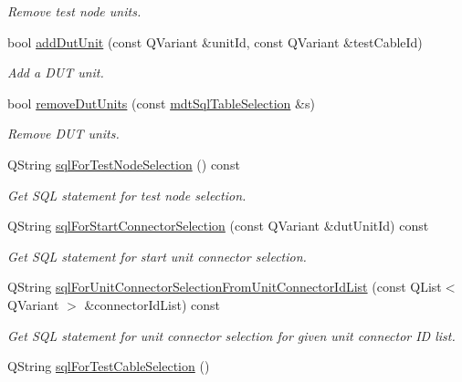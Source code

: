 \begin{DoxyCompactItemize}
\begin{DoxyCompactList}\small\item\em Remove test node units. \end{DoxyCompactList}\item 
bool \hyperlink{classmdt_tt_test_connection_cable_af024a5c28e223181ff318978abcbe1f1}{add\-Dut\-Unit} (const Q\-Variant \&unit\-Id, const Q\-Variant \&test\-Cable\-Id)
\begin{DoxyCompactList}\small\item\em Add a D\-U\-T unit. \end{DoxyCompactList}\item 
bool \hyperlink{classmdt_tt_test_connection_cable_a268dafea5cc285e4992c38ea86ea98a9}{remove\-Dut\-Units} (const \hyperlink{classmdt_sql_table_selection}{mdt\-Sql\-Table\-Selection} \&s)
\begin{DoxyCompactList}\small\item\em Remove D\-U\-T units. \end{DoxyCompactList}\item 
Q\-String \hyperlink{classmdt_tt_test_connection_cable_a03785cef753bae2d7d2dfd0fe1c9a6cf}{sql\-For\-Test\-Node\-Selection} () const 
\begin{DoxyCompactList}\small\item\em Get S\-Q\-L statement for test node selection. \end{DoxyCompactList}\item 
Q\-String \hyperlink{classmdt_tt_test_connection_cable_a5d5769169257b44e9087bca43ea709d1}{sql\-For\-Start\-Connector\-Selection} (const Q\-Variant \&dut\-Unit\-Id) const 
\begin{DoxyCompactList}\small\item\em Get S\-Q\-L statement for start unit connector selection. \end{DoxyCompactList}\item 
Q\-String \hyperlink{classmdt_tt_test_connection_cable_a611358757b43de273a64cfa69c9ef46e}{sql\-For\-Unit\-Connector\-Selection\-From\-Unit\-Connector\-Id\-List} (const Q\-List$<$ Q\-Variant $>$ \&connector\-Id\-List) const 
\begin{DoxyCompactList}\small\item\em Get S\-Q\-L statement for unit connector selection for given unit connector I\-D list. \end{DoxyCompactList}\item 
Q\-String \hyperlink{classmdt_tt_test_connection_cable_a983a8880bb1dcefd55101e26020f4c54}{sql\-For\-Test\-Cable\-Selection} ()

\end{DoxyCompactItemize}
